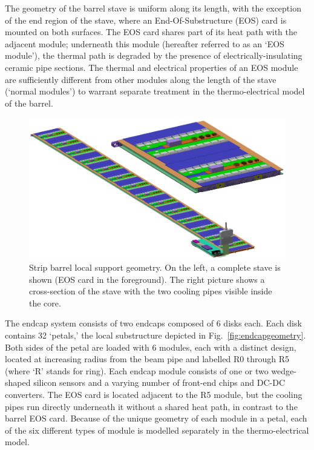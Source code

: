 The geometry of the barrel stave is uniform along its length, with the exception of the end region of the stave, where an End-Of-Substructure (EOS) card is mounted on both surfaces. The EOS card shares part of its heat path with the adjacent module; underneath this module (hereafter referred to as an `EOS module'), the thermal path is degraded by the presence of electrically-insulating ceramic pipe sections. The thermal and electrical properties of an EOS module are sufficiently different from other modules along the length of the stave (`normal modules') to warrant separate treatment in the thermo-electrical model of the barrel.

\begin{figure}[ht]
\centering
\includegraphics[width=0.8\linewidth]{figures/stave.pdf}
\caption{Strip barrel local support geometry. On the left, a complete stave is shown (EOS card in the foreground). The right picture shows a cross-section of the stave with the two cooling pipes visible inside the core. }
\label{fig:barrelgeometry}
\end{figure}

The endcap system consists of two endcaps composed of 6 disks each.
Each disk contains 32 `petals,' the local substructure depicted in Fig.~\ref{fig:endcapgeometry}.
Both sides of the petal are loaded with 6 modules, each with a distinct design,
located at increasing radius from the beam pipe and labelled R0 through R5 (where `R' stands for ring).
Each endcap module consists of one
or two wedge-shaped silicon sensors and a varying number of front-end chips and DC-DC converters.
The EOS card is located adjacent to the R5 module, but the
cooling pipes run directly underneath it without a shared heat path, in contrast to the barrel EOS card.
Because of the unique geometry of each module in a petal, each of the six different types of module is
modelled separately in the thermo-electrical model.

